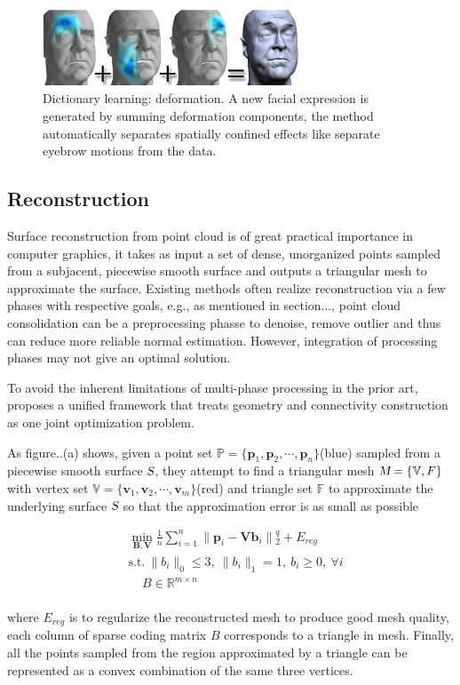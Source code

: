 \begin{figure}[ht]
  \centering
  \includegraphics[width=3in]{images/localdefor_learning}
  \caption{Dictionary learning: deformation\cite{neumann2013sparse}. A new facial expression is generated by summing deformation components, the method automatically separates spatially confined effects like separate eyebrow motions from the data.}
\end{figure}


\subsection{Reconstruction}
\label{subsec:reconstruction}

Surface reconstruction from point cloud is of great practical importance in computer graphics,
it takes as input a set of dense, unorganized points sampled from a subjacent, piecewise smooth surface and outputs a triangular mesh to approximate the surface.
Existing methods often realize reconstruction via a few phases with respective goals, e.g., as mentioned in section..., point cloud consolidation can be a preprocessing phasse to denoise, remove outlier and thus can reduce more reliable normal estimation.
However, integration of processing phases may not give an optimal solution.

To avoid the inherent limitations of multi-phase processing in the prior art, \cite{xiong2014robust} proposes a unified framework that treats geometry and connectivity construction as one joint optimization problem.

As figure..(a) shows, given a point set $\mathbb{P}=\{ \mathbf{p}_1, \mathbf{p}_2, \cdots, \mathbf{p}_n \}$(blue) sampled from a piecewise smooth surface $\textsl{S}$,
they attempt to find a triangular mesh $\textsl{M}=\{ \mathbb{V}, \mathbb{}F\}$ with
vertex set $\mathbb{V}=\{ \mathbf{v}_1, \mathbf{v}_2, \cdots, \mathbf{v}_m \}$(red) and triangle set $\mathbb{F}$ to approximate the underlying surface $\textsl{S}$ so that the approximation error is as small as possible

\small{
\begin{equation}
 \label{eq:dictreconstruction}
 \begin{split}
 & \min_{\mathbf{B},\mathbf{V}}\frac{1}{n}\sum_{i=1}^{n}\|\mathbf{p}_{i}-\mathbf{Vb}_{i}\|{_2^{q}}+E_{reg}\\
 & \mathrm{s.t.}~\|b_{i}\|_0\le3,~\|b_{i}\|_1=1,~b_{i}\ge0,~\forall i \\
 & ~~~~~B\in \mathbb{R}^{m\times n}
 \end{split}
\end{equation}
}
\\
where $E_{reg}$ is to regularize the reconstructed mesh to produce good mesh quality,
each column of sparse coding matrix $B$ corresponds to a triangle in mesh. Finally, all the points sampled from the region approximated by a triangle can be represented as a convex combination of the same three vertices.

